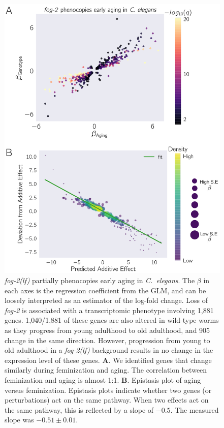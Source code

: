 \documentclass[9pt,twocolumn,twoside]{gsag3jnl}
\newcommand{\cel}{\emph{C.~elegans}}
\newcommand{\fog}{\emph{\mbox{fog-2(lf)}}}
\newcommand{\gene}[1]{\emph{\mbox{#1}}}
\newcommand{\fogn}{1,881}
\newcommand{\coexpressed}{905}
\newcommand{\intersectn}{1,040}
\begin{document}
\begin{figure}
  \renewcommand{\familydefault}{\sfdefault}\normalfont{}
  \centering
  \includegraphics[width=\linewidth]{../../output/figs/final_figs/aberrant_aging.pdf}
  \caption{
    \fog{} partially phenocopies early aging in \cel{}. The $\beta$ in each axes
    is the regression coefficient from the GLM, and can be loosely interpreted
    as an estimator of the log-fold change. Loss of \gene{fog-2} is
    associated with a transcriptomic phenotype involving \fogn{} genes.
    \intersectn{}/\fogn{} of these genes are also altered in wild-type worms as
    they progress from young adulthood to old adulthood, and \coexpressed{}
    change in the same direction. However, progression from young to old
    adulthood in a \fog{} background results in no change in the expression
    level of these genes.
    \textbf{A}. We identified genes that change similarly
    during feminization and aging. The correlation between feminization and
    aging is almost 1:1.
    \textbf{B}. Epistasis plot of aging versus feminization.
    Epistasis plots indicate whether two genes (or perturbations) act on the
    same pathway. When two effects act on the same pathway, this is reflected by
    a slope of $-0.5$. The measured slope was $-0.51 \pm 0.01$.
  }%
\label{fig:aberrant_aging}
\end{figure}
\end{document}
